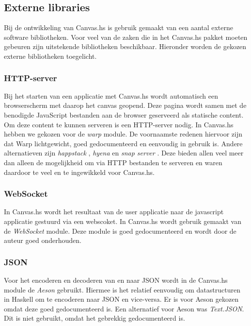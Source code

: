 \subsection{Externe libraries}
\label{subsec:externe_libraries}
Bij de ontwikkeling van Canvas.hs is gebruik gemaakt van een aantal externe software bibliotheken. Voor veel van de zaken die in het Canvas.hs pakket moeten gebeuren zijn uitstekende bibliotheken beschikbaar. Hieronder worden de gekozen externe bibliotheken toegelicht.

\subsubsection{HTTP-server}
Bij het starten van een applicatie met Canvas.hs wordt automatisch een browserscherm met daarop het canvas geopend. Deze pagina wordt samen met de benodigde JavaScript bestanden aan de browser geserveerd als statische content. Om deze content te kunnen serveren is een HTTP-server nodig. In Canvas.hs hebben we gekozen voor de \emph{warp} \cite{Warp} module. De voornaamste redenen hiervoor zijn dat Warp lichtgewicht, goed gedocumenteerd en eenvoudig in gebruik is. Andere alternatieven zijn \emph{happstack} \cite{Happstack}, \emph{hyena} \cite{Hyena} en \emph{snap server} \cite{SnapServer}. Deze bieden allen veel meer dan alleen de mogelijkheid om via HTTP bestanden te serveren en waren daardoor te veel en te ingewikkeld voor Canvas.hs.

\subsubsection{WebSocket}
In Canvas.hs wordt het resultaat van de user applicatie naar de javascript applicatie gestuurd via een webscoket. In Canvas.hs wordt gebruik gemaakt van de \emph{WebSocket}  \cite{WebSocket} module. Deze module is goed gedocumenteerd en wordt door de auteur goed onderhouden.

\subsubsection{JSON}
Voor het encoderen en decoderen van en naar JSON wordt in de Canvas.hs module de \emph{Aeson} \cite{Aeson} gebruikt. Hiermee is het relatief eenvoudig om datastructuren in Haskell om te encoderen naar JSON en vice-versa. Er is voor Aeson gekozen omdat deze goed gedocumenteerd is. Een alternatief voor Aeson was \emph{Text.JSON}. Dit is niet gebruikt, omdat het gebrekkig gedocumenteerd is.

